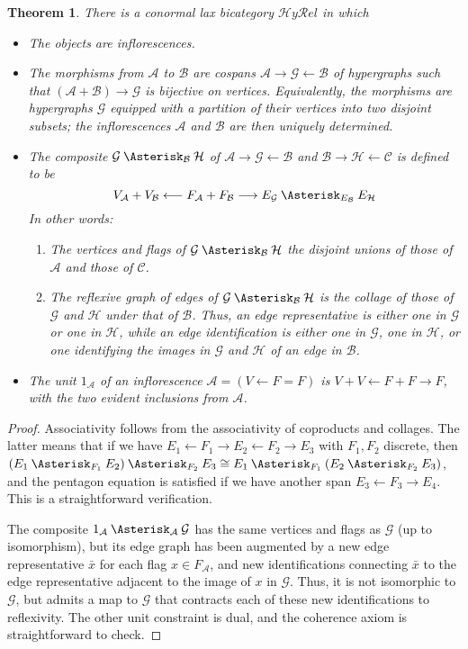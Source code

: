 \documentclass{article}
\newtheorem{thm}{Theorem}[section]
\theoremstyle{definition}
\theoremstyle{remark}
\def\A{\mathcal{A}}
\def\B{\mathcal{B}}
\def\C{\mathcal{C}}
\def\G{\mathcal{G}}
\def\H{\mathcal{H}}
\let\ot\leftarrow
\def\hyrel{\mathcal{H}\mathit{y}\mathcal{R}\mathit{el}}
\def\coll{\mathbin{\Asterisk}}
\begin{document}
\begin{thm}\label{thm:hyrel}
  There is a conormal lax bicategory $\hyrel$ in which
  \begin{itemize}
  \item The objects are inflorescences.
  \item The morphisms from $\A$ to $\B$ are cospans $\A \to \G \ot \B$ of hypergraphs such that $(\A+\B) \to \G$ is bijective on vertices.
    Equivalently, the morphisms are hypergraphs $\G$ equipped with a partition of their vertices into two disjoint subsets; the inflorescences $\A$ and $\B$ are then uniquely determined.
  \item The composite $\G \coll_{\B} \H$ of $\A \to \G \ot \B$ and $\B \to \H \ot \C$ is defined to be
    \[ V_{\A}  + V_{\B} \longleftarrow F_{\A} + F_{\B} \longrightarrow E_{\G} \coll_{E_\B} E_{\H} \]
    In other words:
    \begin{enumerate}
    \item The vertices and flags of $\G \coll_{\B} \H$ the disjoint unions of those of $\A$ and those of $\C$.
    \item The reflexive graph of edges of $\G \coll_{\B} \H$ is the collage of those of $\G$ and $\H$ under that of $\B$.
      Thus, an edge representative is either one in $\G$ or one in $\H$, while an edge identification is either one in $\G$, one in $\H$, or one identifying the images in $\G$ and $\H$ of an edge in $\B$.
    \end{enumerate}
  \item The unit $1_{\A}$ of an inflorescence $\A=(V\ot F = F)$ is $V+V \ot F+F \to F$, with the two evident inclusions from $\A$.
  \end{itemize}
\end{thm}
\begin{proof}
  Associativity follows from the associativity of coproducts and collages.
  The latter means that if we have $E_1 \ot F_1 \to E_2 \ot F_2 \to E_3$ with $F_1,F_2$ discrete, then $(E_1 \coll_{F_1} E_2) \coll_{F_2} E_3 \cong E_1 \coll_{F_1} (E_2 \coll_{F_2} E_3)$, and the pentagon equation is satisfied if we have another span $E_3 \ot F_3 \to E_4$.
  This is a straightforward verification.

  The composite $1_{\A} \coll_{\A} \G$ has the same vertices and flags as $\G$ (up to isomorphism), but its edge graph has been augmented by a new edge representative $\bar{x}$ for each flag $x\in F_{\A}$, and new identifications connecting $\bar{x}$ to the edge representative adjacent to the image of $x$ in $\G$.
  Thus, it is not isomorphic to $\G$, but admits a map to $\G$ that contracts each of these new identifications to reflexivity.
  The other unit constraint is dual, and the coherence axiom is straightforward to check.
\end{proof}
\end{document}
